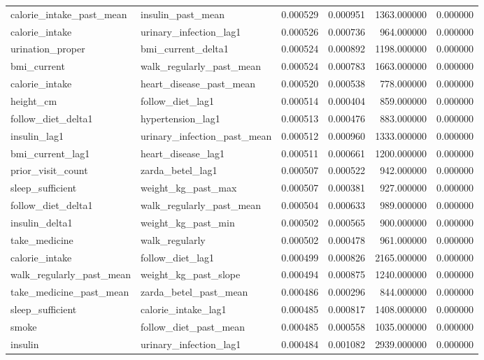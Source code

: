 \begin{longtable}{llrrrr}
calorie\_intake\_past\_mean & insulin\_past\_mean & 0.000529 & 0.000951 & 1363.000000 & 0.000000 \\
calorie\_intake & urinary\_infection\_lag1 & 0.000526 & 0.000736 & 964.000000 & 0.000000 \\
urination\_proper & bmi\_current\_delta1 & 0.000524 & 0.000892 & 1198.000000 & 0.000000 \\
bmi\_current & walk\_regularly\_past\_mean & 0.000524 & 0.000783 & 1663.000000 & 0.000000 \\
calorie\_intake & heart\_disease\_past\_mean & 0.000520 & 0.000538 & 778.000000 & 0.000000 \\
height\_cm & follow\_diet\_lag1 & 0.000514 & 0.000404 & 859.000000 & 0.000000 \\
follow\_diet\_delta1 & hypertension\_lag1 & 0.000513 & 0.000476 & 883.000000 & 0.000000 \\
insulin\_lag1 & urinary\_infection\_past\_mean & 0.000512 & 0.000960 & 1333.000000 & 0.000000 \\
bmi\_current\_lag1 & heart\_disease\_lag1 & 0.000511 & 0.000661 & 1200.000000 & 0.000000 \\
prior\_visit\_count & zarda\_betel\_lag1 & 0.000507 & 0.000522 & 942.000000 & 0.000000 \\
sleep\_sufficient & weight\_kg\_past\_max & 0.000507 & 0.000381 & 927.000000 & 0.000000 \\
follow\_diet\_delta1 & walk\_regularly\_past\_mean & 0.000504 & 0.000633 & 989.000000 & 0.000000 \\
insulin\_delta1 & weight\_kg\_past\_min & 0.000502 & 0.000565 & 900.000000 & 0.000000 \\
take\_medicine & walk\_regularly & 0.000502 & 0.000478 & 961.000000 & 0.000000 \\
calorie\_intake & follow\_diet\_lag1 & 0.000499 & 0.000826 & 2165.000000 & 0.000000 \\
walk\_regularly\_past\_mean & weight\_kg\_past\_slope & 0.000494 & 0.000875 & 1240.000000 & 0.000000 \\
take\_medicine\_past\_mean & zarda\_betel\_past\_mean & 0.000486 & 0.000296 & 844.000000 & 0.000000 \\
sleep\_sufficient & calorie\_intake\_lag1 & 0.000485 & 0.000817 & 1408.000000 & 0.000000 \\
smoke & follow\_diet\_past\_mean & 0.000485 & 0.000558 & 1035.000000 & 0.000000 \\
insulin & urinary\_infection\_lag1 & 0.000484 & 0.001082 & 2939.000000 & 0.000000 \\

\end{longtable}
